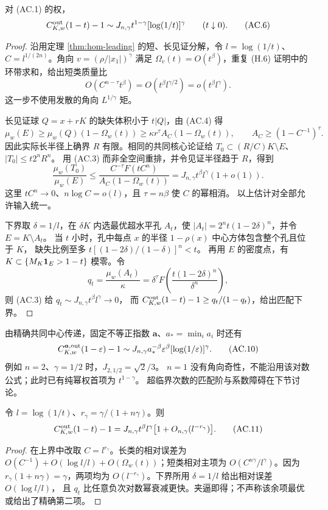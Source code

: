 \begin{theorem}[临界角向幂权的尖锐对数首项]\label{thm:critical-angular}
对 (AC.1) 的权，
\[
 C^{\rm out}_{K,w}(1-t)-1
 \sim J_{n,\gamma}t^{1-\gamma}[\log(1/t)]^\gamma\qquad(t\downarrow0). \tag{AC.6}
\]
\end{theorem}
\begin{proof}
沿用定理 \ref{thm:hom-leading} 的短、长见证分解，令
$l=\log(1/t)$、$C=l^{1/(2n)}$。角向 $v=(\rho/|x_1|)^\gamma$ 满足
$\Omega_v(t)=O(t^\beta)$，重复 (H.6) 证明中的环带求和，给出短类质量比
\[
 O(C^{n-\tau}t^\beta)=O(t^\beta l^{\gamma/2})=o(t^\beta l^\gamma). \tag{AC.7}
\]
这一步不使用发散的角向 $L^{1/\gamma}$ 矩。

长见证球 $Q=x+rK$ 的缺失体积小于 $t|Q|$，由 (AC.4) 得
\[
 \mu_w(E)\ge\mu_w(Q)(1-\Omega_w(t))
 \ge\kappa r^\tau A_C(1-\Omega_w(t)),\qquad
 A_C\ge(1-C^{-1})^\tau. \tag{AC.8}
\]
因此实际长半径上确界 $R$ 有限。相同的共同核心论证给
$T_0\subset(R/C)K\setminus E$、$|T_0|\le t2^nR^n$。
用 (AC.3) 而非全空间重排，并令见证半径趋于 $R$，得到
\[
 \frac{\mu_w(T_0)}{\mu_w(E)}
 \le\frac{C^{-\tau}F(tC^n)}{A_C(1-\Omega_w(t))}
 =J_{n,\gamma}t^\beta l^\gamma(1+o(1)). \tag{AC.9}
\]
这里 $tC^n\to0$、$n\log C=o(l)$，且 $\tau=n\beta$ 使 $C$ 的幂相消。
以上估计对全部允许输入统一。

下界取 $\delta=1/l$，在 $\delta K$ 内选最优超水平孔 $A_t$，使
$|A_t|=2^nt(1-2\delta)^n$，并令 $E=K\setminus A_t$。
当 $t$ 小时，孔中每点 $x$ 的半径 $1-\rho(x)$ 中心方体包含整个孔且位于 $K$，
缺失比例至多 $t[(1-2\delta)/(1-\delta)]^n<t$。
再用 $E$ 的密度点，有 $K\subset\{M_K\mathbf 1_E>1-t\}$ 模零。令
\[
 q_t=\frac{\mu_w(A_t)}\kappa
 =\delta^\tau F\!\left(\frac{t(1-2\delta)^n}{\delta^n}\right),
\]
则 (AC.3) 给 $q_t\sim J_{n,\gamma}t^\beta l^\gamma\to0$，
而 $C^{\rm out}_{K,w}(1-t)-1\ge q_t/(1-q_t)$，给出匹配下界。
\end{proof}
由精确共同中心传递，固定不等正指数 $\boldsymbol a$、$a_*=\min_i a_i$ 时还有
\[
 C^{\boldsymbol a,\rm out}_{K,w}(1-\varepsilon)-1
 \sim J_{n,\gamma}a_*^{-\beta}\varepsilon^\beta
 [\log(1/\varepsilon)]^\gamma. \tag{AC.10}
\]
例如 $n=2$、$\gamma=1/2$ 时，$J_{2,1/2}=\sqrt2/3$。
$n=1$ 没有角向奇性，不能沿用该对数公式；此时已有纯幂权首项为 $t^{1-\gamma}$。
超临界次数的匹配阶与系数障碍在下节讨论。

\begin{corollary}[一个非尖锐的相对余项]
令 $l=\log(1/t)$、$r_\gamma=\gamma/(1+n\gamma)$。则
\[
 C^{\rm out}_{K,w}(1-t)-1
 =J_{n,\gamma}t^\beta l^\gamma\bigl[1+O_{n,\gamma}(l^{-r_\gamma})\bigr]. \tag{AC.11}
\]
\end{corollary}
\begin{proof}
在上界中改取 $C=l^{r_\gamma}$。长类的相对误差为
$O(C^{-1})+O(\log l/l)+O(\Omega_w(t))$；短类相对主项为
$O(C^{n\gamma}/l^\gamma)$。因为 $r_\gamma(1+n\gamma)=\gamma$，两项均为
$O(l^{-r_\gamma})$。下界所用 $\delta=1/l$ 给出相对误差 $O(\log l/l)$，
且 $q_t$ 比任意负次对数幂衰减更快。夹逼即得；不声称该余项最优或给出了精确第二项。
\end{proof}


